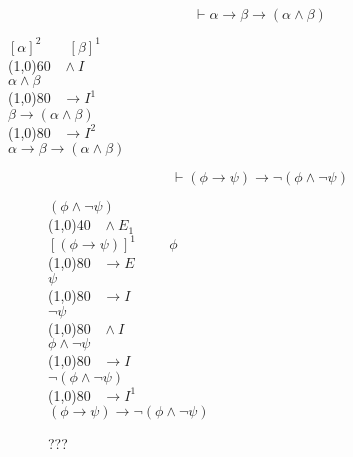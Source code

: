 \documentclass{article}
\theoremstyle{break}
\theoremstyle{break}
\theoremstyle{break}
\theoremstyle{break}
\begin{document}
\begin{exercise}
    \[
    \vdash \alpha \to \beta \to (\alpha \wedge \beta)
    \] 
    \begin{center}
        \( [\alpha]^2\;\;\;\;\;\;\; [\beta]^1 \) \\
                    \hspace{0.6cm}\line(1,0){60}\(\;\;\; \wedge I \)\\
        \( \alpha \wedge \beta \) \\
                    \hspace{1cm}\line(1,0){80}\(\;\;\; \to I^1 \)\\
         \( \beta \to (\alpha \wedge \beta) \) \\
                     \hspace{1cm}\line(1,0){80}\(\;\;\; \to I^2 \)\\
         \( \alpha \to  \beta \to  (\alpha \wedge \beta) \) 
    \end{center}
\end{exercise}

\begin{figure}[H]
    \begin{exercise}[a casa]
        \[
            \vdash (\phi \to \psi) \to \neg (\phi \wedge \neg \psi)
        \] 
        \begin{center}
            \hspace{1.8cm}\((\phi \wedge \neg \psi) \) \\
            \hspace{2.7cm}\line(1,0){40}\(\;\;\; \wedge E_1 \)\\
            \( [(\phi \to \psi)]^1 \hspace{1cm} \phi \) \hspace{1cm}\\
            \hspace{1cm}\line(1,0){80}\(\;\;\; \to E \)\\
            \( \psi \) \\
            \hspace{1cm}\line(1,0){80}\(\;\;\; \to I \)\\
            \( \neg \psi \)\\ 
            \hspace{1cm}\line(1,0){80}\(\;\;\; \wedge I \)\\
            \( \phi \wedge \neg \psi \) \\
            \hspace{1cm}\line(1,0){80}\(\;\;\; \to I \)\\
            \( \neg (\phi \wedge \neg \psi) \) \\
            \hspace{1cm}\line(1,0){80}\(\;\;\; \to I^1 \)\\
            \( (\phi \to \psi) \to \neg(\phi \wedge \neg \psi) \) 
        \end{center}
        ???
    \end{exercise}
\end{figure}
\end{document}
